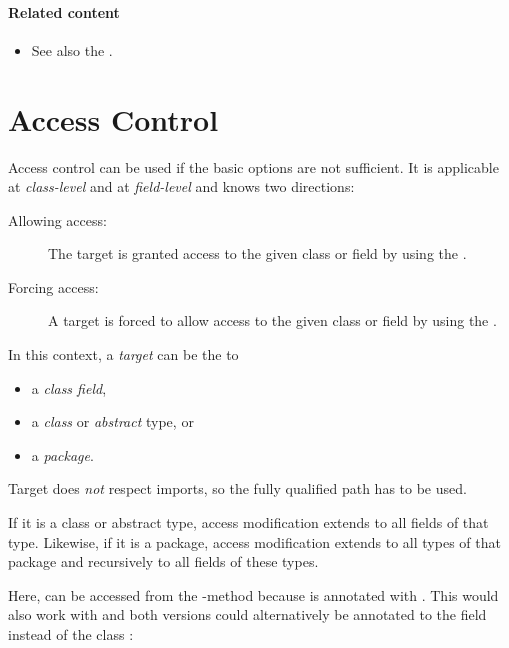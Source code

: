 \paragraph{Related content}
\begin{itemize}
	\item See also the .
\end{itemize}


\section{Access Control}
\label{lf-access-control}

Access control can be used if the basic  options are not sufficient. It is applicable at \emph{class-level} and at \emph{field-level} and knows two directions:

\begin{description}
	\item[Allowing access:] The target is granted access to the given class or field by using the  .
	\item[Forcing access:] A target is forced to allow access to the given class or field by using the  .
\end{description}

In this context, a \emph{target} can be the  to

\begin{itemize}
	\item a \emph{class field},
	\item a \emph{class} or \emph{abstract} type, or
	\item a \emph{package}.
\end{itemize}

Target does \emph{not} respect imports, so the fully qualified path has to be used.

If it is a class or abstract type, access modification extends to all fields of that type. Likewise, if it is a package, access modification extends to all types of that package and recursively to all fields of these types.


Here,  can be accessed from the -method because  is annotated with . This would also work with  and both versions could alternatively be annotated to the field  instead of the class :

